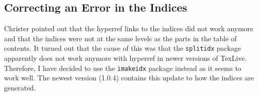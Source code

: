 \subsection{Correcting an Error in the Indices}
\label{task:20150121_jkn0}
Christer pointed out that the hyperref links to the indices did not work anymore and that the indices were not at the same levels as the parts in the table of contents. It turned out that the cause of this was that the {\tt splitidx} package apparently does not work anymore with hyperref in newer versions of TexLive. Therefore, I have decided to use the {\tt imakeidx} package instead as it seems to work well. The newest version (1.0.4) contains this update to how the indices are generated.
